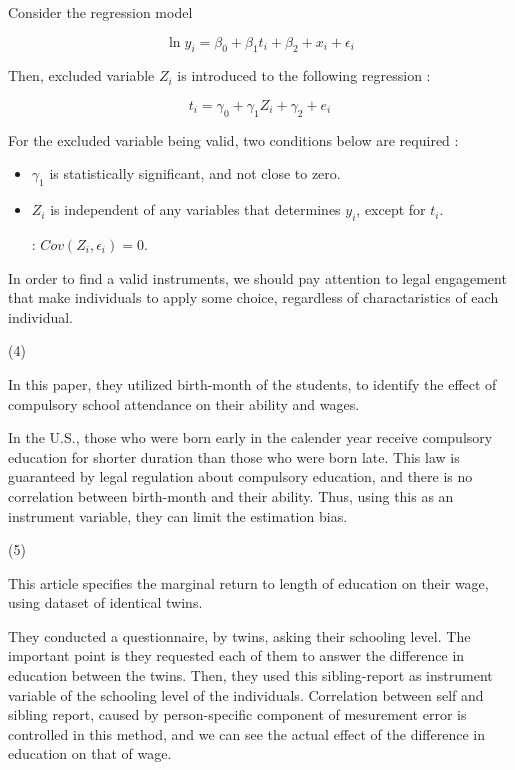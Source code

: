 \documentclass{jsarticle}
\begin{document}
\begin{enumerate}
 Consider the regression model
 
 \[ \ln y_i = \beta_0 + \beta_1 t_i + \beta_2 + x_i + \epsilon_i \]
 
 Then, excluded variable $Z_i$ is introduced to the following regression :
 
 \[t_i = \gamma_0 + \gamma_1 Z_i + \gamma_2 + e_i \]
 
 For the excluded variable being valid, two conditions below are required :
 
  \begin{itemize}
  
  \item $\gamma_1$ is statistically significant, and not close to zero.
  
  \item $Z_i$ is independent of any variables that determines $y_i$, except for $t_i$.
  
  : $Cov(Z_i, \epsilon_i) = 0$.
  
  \end{itemize} 
 
 In order to find a valid instruments, we should pay attention to legal engagement that make individuals to apply some choice, regardless of charactaristics of each individual. 
 
 (4)
 
 In this paper, they utilized birth-month of the students, to identify the effect of compulsory school attendance on their ability and wages.
 
 In the U.S., those who were born early in the calender year receive compulsory education for shorter duration than those who were born late. This law is guaranteed by legal regulation about compulsory education, and there is no correlation between birth-month and their ability. Thus, using this as an instrument variable, they can limit the estimation bias.
 
 (5)
 
This article specifies the marginal return to length of education on their wage, using dataset of identical twins.

They conducted a questionnaire, by twins, asking their schooling level. The important point is they requested each of them to answer the difference in education between the twins. Then, they used this sibling-report as instrument variable of the schooling level of the individuals. Correlation between self and sibling report, caused by person-specific component of mesurement error is controlled in this method, and we can see the actual effect of the difference in education on that of wage.
 
 \end{enumerate}
\end{document}

